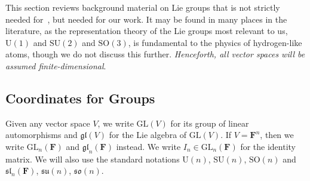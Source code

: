 \documentclass[a4paper,10pt,leqno]{article}
\numberwithin{equation}{section}
\theoremstyle{plain}
\theoremstyle{definition}
\theoremstyle{remark}
\newcommand{\bb}{\mathbf}
\newcommand{\fr}{\mathfrak}
\newcommand{\GL}{\mathrm{GL}}
\newcommand{\SU}{\mathrm{SU}}
\newcommand{\SO}{\mathrm{SO}}
\newcommand{\UL}{\mathrm{U}}
\begin{document}
This section reviews background material on Lie groups that is not strictly needed for~\cite{deleo}, but needed for our work.
It may be found in many places in the literature, as the representation theory of the Lie groups most relevant to us, $\UL(1)$ and $\SU(2)$ and $\SO(3)$, is fundamental to the physics of hydrogen-like atoms, though we do not discuss this further.
\emph{Henceforth, all vector spaces will be assumed finite-dimensional}.

\subsection{Coordinates for Groups}\label{subsec:coords}

Given any vector space $V$, we write $\GL(V)$ for its group of linear automorphisms and $\fr{gl}(V)$ for the Lie algebra of $\GL(V)$.
If $V = \bb{F}^n$, then we write $\GL_n(\bb{F})$ and $\fr{gl}_n(\bb{F})$ instead.
We write $I_n \in \GL_n(\bb{F})$ for the identity matrix.
We will also use the standard notations $\UL(n)$, $\SU(n)$, $\SO(n)$ and $\fr{sl}_n(\bb{F})$, $\fr{su}(n)$, $\fr{so}(n)$.
\end{document}
